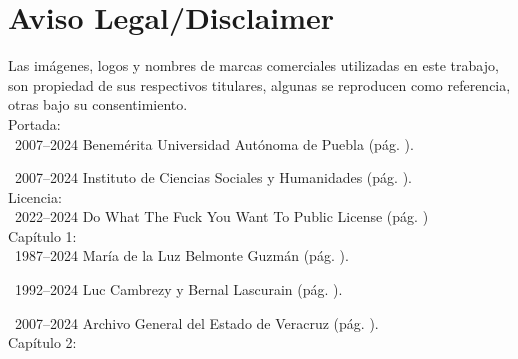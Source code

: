 \documentclass[14pt,twoside,final]{extbook} %
\begin{document}
\chapter{Aviso Legal\slash Disclaimer}
\label{ap:aviso-legal-disclaimer}
\thispagestyle{empty}
\pagestyle{fancy}
\fancyhf{} %
\fancyhead[RO,LE]{\thepage}
\renewcommand{\headrulewidth}{0pt}
\renewcommand{\TeX}{T\kern -.1267em\lower .35ex\hbox {E}\kern -.105emX} %
\renewcommand{\LaTeX}{L\kern-.275em\raisebox{.5ex}{\textsc{a}}\kern-.1em\hbox{\TeX}} %
\renewcommand{\LaTeXe}{L\kern-.275em\raisebox{.5ex}{\textsc{a}}\kern-.1em\hbox{\TeX} \hbox{2}\kern-.03em\raisebox{-.4ex}{\fontencoding{LGR}\selectfont\char 101}} %
Las imágenes, logos y nombres de marcas comerciales utilizadas en este trabajo, son propiedad de sus respectivos titulares, algunas se reproducen como referencia, otras bajo su consentimiento. \\

\noindent Portada: \\

\noindent\textcopyright\ 2007--2024 Benemérita Universidad Autónoma de Puebla (pág. \pageref{fig:buap}).

\noindent\textcopyright\ 2007--2024 Instituto de Ciencias Sociales y Humanidades (pág. \pageref{fig:icsyh}). \\

\noindent Licencia: \\

\noindent\textcopyright\ 2022--2024 Do What The Fuck You Want To Public License (pág. \pageref{fig:wtfpl}) \\

\noindent Capítulo 1: \\

\noindent\textcopyright\ 1987--2024 María de la Luz Belmonte Guzmán (pág. \pageref{fig:veracruz-1857}).

\noindent\textcopyright\ 1992--2024 Luc Cambrezy y Bernal Lascurain (pág. \pageref{fig:jalacingo-principios-xx}).

\noindent\textcopyright\ 2007--2024 Archivo General del Estado de Veracruz (pág. \pageref{fig:progreso-industrial}). \\

\noindent Capítulo 2: \\
\end{document}
